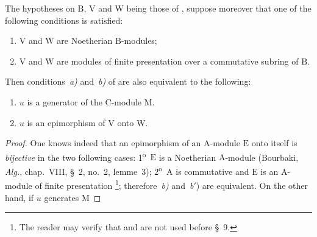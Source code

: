 \begin{corollary}[2.5.7]
\label{IV.2.5.7}
The hypotheses on $\mathrm{B}$, $\mathrm{V}$ and $\mathrm{W}$ being those of , suppose moreover that one of the
following conditions is satisfied:
\begin{enumerate}[label=(\roman*)]
  \item $\mathrm{V}$ and $\mathrm{W}$ are Noetherian $\mathrm{B}$-modules;
  \item $\mathrm{V}$ and $\mathrm{W}$ are modules of finite presentation over a commutative subring of $\mathrm{B}$.
\end{enumerate}
Then conditions~\emph{a)} and~\emph{b)} of  are also equivalent to the following:
\begin{enumerate}[label=\emph{\alph*}$'$)]
  \item $u$ is a generator of the $\mathrm{C}$-module $\mathrm{M}$.
  \item[\emph{b}$'$)] $u$ is an epimorphism of $\mathrm{V}$ onto $\mathrm{W}$.
\end{enumerate}
\end{corollary}

\begin{proof}
One knows indeed that an epimorphism of an $\mathrm{A}$-module $\mathrm{E}$ onto itself is \emph{bijective} in the two following cases:
1\textsuperscript{o}~$\mathrm{E}$ is a Noetherian $\mathrm{A}$-module (Bourbaki, \emph{Alg.}, chap.~VIII, \S~2, no.~2, lemme~3); 2\textsuperscript{o}~$\mathrm{A}$ is commutative and $\mathrm{E}$ is
an $\mathrm{A}$-module of finite presentation \footnote{The reader may verify that  and  are not used before \S~9.}; therefore~\emph{b)} and~\emph{b}$'$) are equivalent. On the other hand, if $u$ generates $\mathrm{M}$
\end{proof}


